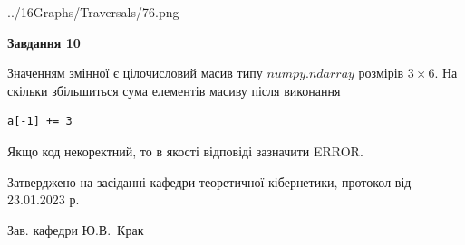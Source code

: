 \documentclass[12pt, ukrainian]{article}
\begin{document}
{\begin {large}
\begin{center}
	{../16Graphs/Traversals/76.png}
\end{center}\par
\newpage

{\begin {center}\textbf{Завдання 10}\end {center}}\par
Значенням змінної  є цілочисловий масив типу $numpy.ndarray$ розмірів $3{\times}6$. На скільки збільшиться сума елементів масиву  після виконання
\begin{verbatim}
a[-1] += 3
\end{verbatim}


Якщо код некоректний, то в якості відповіді зазначити ERROR.\par
\newpage


\end {large}
}
{\smallskip \begin {small} Затверджено на засіданні кафедри теоретичної кібернетики, протокол  від   23.01.2023 р.\par\smallskip\smallskip
{\parbox {6.5 cm}{Зав. кафедри \dotfill Ю.В.~Крак}} \end{small}}
\end{document}
